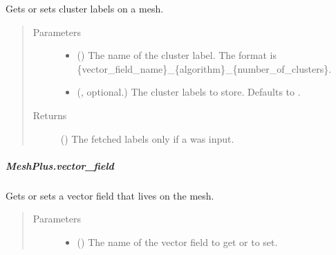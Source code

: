 \documentclass[letterpaper,10pt,english]{sphinxmanual}
\begin{document}
\begin{fulllineitems}
\begin{fulllineitems}
\label{\detokenize{api/generated/directional_clustering.mesh.MeshPlus.clustering_label:directional_clustering.mesh.MeshPlus.clustering_label}}
Gets or sets cluster labels on a mesh.
\begin{quote}\begin{description}
\item[{Parameters}] \leavevmode\begin{itemize}
\item {} 
 () \textendash{} The name of the cluster label.
The format is \{vector\_field\_name\}\_\{algorithm\}\_\{number\_of\_clusters\}.

\item {} 
 (, optional.) \textendash{} The cluster labels to store. Defaults to .

\end{itemize}

\item[{Returns}] \leavevmode
{} () \textendash{} The fetched labels only if a  was input.

\end{description}\end{quote}

\end{fulllineitems}



\subparagraph{MeshPlus.vector\_field}
\label{\detokenize{api/generated/directional_clustering.mesh.MeshPlus.vector_field:meshplus-vector-field}}\label{\detokenize{api/generated/directional_clustering.mesh.MeshPlus.vector_field::doc}}

\begin{fulllineitems}
\label{\detokenize{api/generated/directional_clustering.mesh.MeshPlus.vector_field:directional_clustering.mesh.MeshPlus.vector_field}}
Gets or sets a vector field that lives on the mesh.
\begin{quote}\begin{description}
\item[{Parameters}] \leavevmode\begin{itemize}
\item {} 
 () \textendash{} The name of the vector field to get or to set.


\end{itemize}
\end{description}
\end{quote}
\end{fulllineitems}
\end{fulllineitems}
\end{document}
